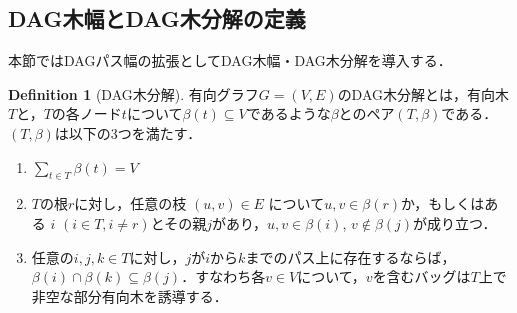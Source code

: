 \documentclass[master]{kuisthesis}		%
\theoremstyle{plain}
\theoremstyle{definition}
\newtheorem{definition*}{Definition}
\begin{document}
\subsection{DAG木幅とDAG木分解の定義}

本節ではDAGパス幅の拡張としてDAG木幅・DAG木分解を導入する．

\begin{definition*}[DAG木分解]
 有向グラフ$G=(V, E)$のDAG木分解とは，有向木$T$と，$T$の各ノード$t$について$\beta(t) \subseteq V$であるような$\beta$とのペア$(T, \beta)$である．$(T, \beta)$は以下の3つを満たす．
 
\begin{enumerate}
    \item $\sum_{t\in T} \beta(t) = V$ 
    \item $T$の根$r$に対し，任意の枝 $ (u, v) \in E $ について$u, v \in \beta(r)$か，もしくはある $i$ $(i \in T, i \neq r)$とその親$j$があり，$u, v \in \beta(i)$, $v \notin \beta(j)$が成り立つ．
    \item 任意の$ i, j, k \in T$に対し，$j$が$i$から$k$までのパス上に存在するならば，$\beta(i) \cap \beta(k) \subseteq \beta(j)$．すなわち各$v \in V$について，$v$を含むバッグは$T$上で非空な部分有向木を誘導する．
    \end{enumerate}
\end{definition*}


\end{document}
